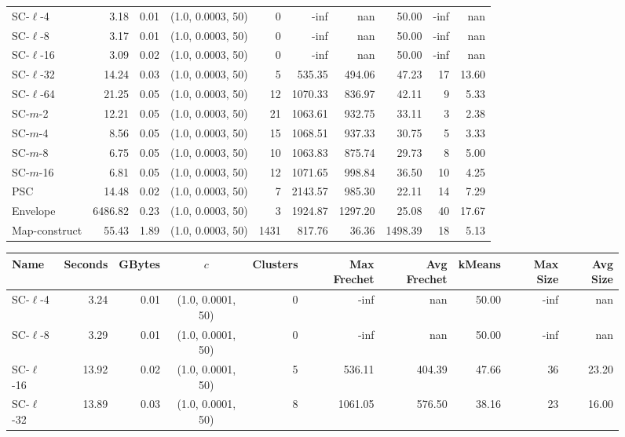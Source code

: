 \documentclass[11pt]{article}
\begin{document}
\begin{figure}
\begin{center}
\begin{minipage}{\textwidth}
{\begin{tabular}{@{}lrrcrrrrrr@{}}
        \midrule
        SC-$\ell$-4 & 3.18 & 0.01 & (1.0, 0.0003, 50) & 0 & -inf & nan & 50.00 & -inf & nan\\
        SC-$\ell$-8 & 3.17 & 0.01 & (1.0, 0.0003, 50) & 0 & -inf & nan & 50.00 & -inf & nan\\
        SC-$\ell$-16 & 3.09 & 0.02 & (1.0, 0.0003, 50) & 0 & -inf & nan & 50.00 & -inf & nan\\
        SC-$\ell$-32 & 14.24 & 0.03 & (1.0, 0.0003, 50) & 5 & 535.35 & 494.06 & 47.23 & 17 & 13.60\\
        SC-$\ell$-64 & 21.25 & 0.05 & (1.0, 0.0003, 50) & 12 & 1070.33 & 836.97 & 42.11 & 9 & 5.33\\
        SC-$m$-2 & 12.21 & 0.05 & (1.0, 0.0003, 50) & 21 & 1063.61 & 932.75 & 33.11 & 3 & 2.38\\
        SC-$m$-4 & 8.56 & 0.05 & (1.0, 0.0003, 50) & 15 & 1068.51 & 937.33 & 30.75 & 5 & 3.33\\
        SC-$m$-8 & 6.75 & 0.05 & (1.0, 0.0003, 50) & 10 & 1063.83 & 875.74 & 29.73 & 8 & 5.00\\
        SC-$m$-16 & 6.81 & 0.05 & (1.0, 0.0003, 50) & 12 & 1071.65 & 998.84 & 36.50 & 10 & 4.25\\
        PSC & 14.48 & 0.02 & (1.0, 0.0003, 50) & 7 & 2143.57 & 985.30 & 22.11 & 14 & 7.29\\
        Envelope & 6486.82 & 0.23 & (1.0, 0.0003, 50) & 3 & 1924.87 & 1297.20 & 25.08 & 40 & 17.67\\
        Map-construct & 55.43 & 1.89 & (1.0, 0.0003, 50) & 1431 & 817.76 & 36.36 & 1498.39 & 18 & 5.13\\
        \bottomrule
    \end{tabular}
    }
    {
    \begin{tabular}{@{}lrrcrrrrrr@{}}
        \toprule
        Name & Seconds & GBytes & $c$ & Clusters & Max Frechet & Avg Frechet & kMeans & Max Size & Avg Size\\
        \midrule
        SC-$\ell$-4 & 3.24 & 0.01 & (1.0, 0.0001, 50) & 0 & -inf & nan & 50.00 & -inf & nan\\
        SC-$\ell$-8 & 3.29 & 0.01 & (1.0, 0.0001, 50) & 0 & -inf & nan & 50.00 & -inf & nan\\
        SC-$\ell$-16 & 13.92 & 0.02 & (1.0, 0.0001, 50) & 5 & 536.11 & 404.39 & 47.66 & 36 & 23.20\\
        SC-$\ell$-32 & 13.89 & 0.03 & (1.0, 0.0001, 50) & 8 & 1061.05 & 576.50 & 38.16 & 23 & 16.00\\

\end{tabular}}
\end{minipage}
\end{center}
\end{figure}
\end{document}
